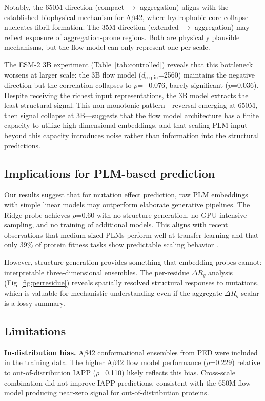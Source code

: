 \documentclass[10pt,letterpaper]{article}
\begin{document}
Notably, the 650M direction (compact $\rightarrow$ aggregation) aligns with the established biophysical mechanism for A$\beta$42, where hydrophobic core collapse nucleates fibril formation. The 35M direction (extended $\rightarrow$ aggregation) may reflect exposure of aggregation-prone regions. Both are physically plausible mechanisms, but the flow model can only represent one per scale.

The ESM-2 3B experiment (Table~\ref{tab:controlled}) reveals that this bottleneck worsens at larger scale: the 3B flow model ($d_{\text{seq\_in}}$=2560) maintains the negative direction but the correlation collapses to $\rho$=$-$0.076, barely significant ($p$=0.036). Despite receiving the richest input representations, the 3B model extracts the least structural signal. This non-monotonic pattern---reversal emerging at 650M, then signal collapse at 3B---suggests that the flow model architecture has a finite capacity to utilize high-dimensional embeddings, and that scaling PLM input beyond this capacity introduces noise rather than information into the structural predictions.

\subsection*{Implications for PLM-based prediction}

Our results suggest that for mutation effect prediction, raw PLM embeddings with simple linear models may outperform elaborate generative pipelines. The Ridge probe achieves $\rho$=0.60 with no structure generation, no GPU-intensive sampling, and no training of additional models. This aligns with recent observations that medium-sized PLMs perform well at transfer learning \cite{medium_plm2025} and that only 39\% of protein fitness tasks show predictable scaling behavior \cite{scaling2025}.

However, structure generation provides something that embedding probes cannot: interpretable three-dimensional ensembles. The per-residue $\Delta R_g$ analysis (Fig~\ref{fig:perresidue}) reveals spatially resolved structural responses to mutations, which is valuable for mechanistic understanding even if the aggregate $\Delta R_g$ scalar is a lossy summary.

\subsection*{Limitations}

\textbf{In-distribution bias.} A$\beta$42 conformational ensembles from PED were included in the training data. The higher A$\beta$42 flow model performance ($\rho$=0.229) relative to out-of-distribution IAPP ($\rho$=0.110) likely reflects this bias. Cross-scale combination did not improve IAPP predictions, consistent with the 650M flow model producing near-zero signal for out-of-distribution proteins.
\end{document}
